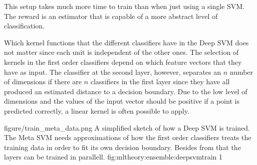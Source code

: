 This setup takes much more time to train than when just using a single SVM. The reward is an estimator that is capable of a more abstract level of classification.

Which kernel functions that the different classifiers have in the Deep SVM does not matter since each unit is independent of the other ones. The selection of kernels in the first order classifiers depend on which feature vectors that they have as input. The classifier at the second layer, however, separates an $n$ number of dimensions if there are $n$ classifiers in the first layer since they have all produced an estimated distance to a decision boundary. Due to the low level of dimensions and the values of the input vector should be positive if a point is predicted correctly, a linear kernel is often possible to apply.

\singlefigure
{figure/train_meta_data.png}
{A simplified sketch of how a Deep SVM is trained. The Meta SVM needs approximations of how the first order classifiers treats the training data in order to fit its own decision boundary. Besides from that the layers can be trained in parallell.}
{fig:mltheory:ensemble:deepsvmtrain}
{1}
